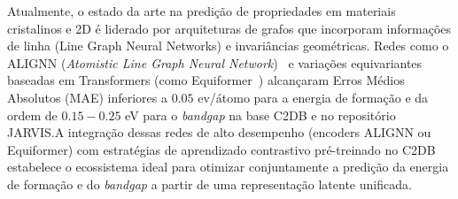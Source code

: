 Atualmente, o estado da arte na predição de propriedades em materiais cristalinos e 2D é liderado por arquiteturas de grafos que incorporam informações de linha (Line Graph Neural Networks) e invariâncias geométricas. Redes como o ALIGNN (\textit{Atomistic Line Graph Neural Network})~\cite{choudhary2021atomistic} e variações equivariantes baseadas em Transformers (como Equiformer~\cite{liao2022equiformer}) alcançaram Erros Médios Absolutos (MAE) inferiores a $0.05$ ev/átomo para a energia de formação e da ordem de $0.15-0.25$ eV para o \textit{bandgap} na base C2DB e no repositório JARVIS.A integração dessas redes de alto desempenho (encoders ALIGNN ou Equiformer) com estratégias de aprendizado contrastivo pré-treinado no C2DB estabelece o ecossistema ideal para otimizar conjuntamente a predição da energia de formação e do \textit{bandgap} a partir de uma representação latente unificada. 


